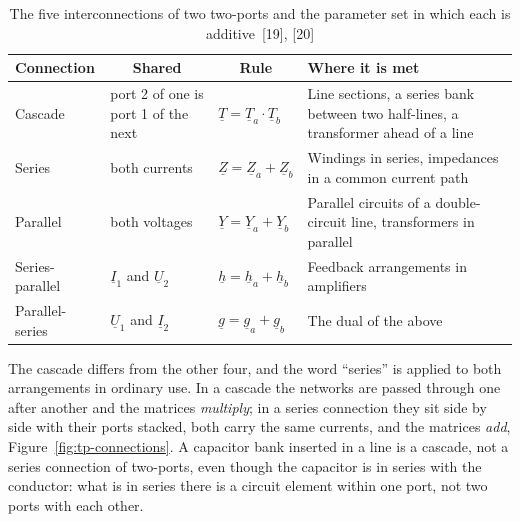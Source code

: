 \begin{table}[!ht]
  \centering
  \begin{tabularx}{\linewidth}{@{}l l l X@{}}
    \toprule
    \textbf{Connection} & \multicolumn{1}{c}{\textbf{Shared}}
      & \multicolumn{1}{c}{\textbf{Rule}} & \textbf{Where it is met} \\
    \midrule
    Cascade & port 2 of one is port 1 of the next
      & $\underline{T} = \underline{T}_a \cdot \underline{T}_b$
      & Line sections, a series bank between two half-lines, a transformer
        ahead of a line \\
    Series & both currents
      & $\underline{Z} = \underline{Z}_a + \underline{Z}_b$
      & Windings in series, impedances in a common current path \\
    Parallel & both voltages
      & $\underline{Y} = \underline{Y}_a + \underline{Y}_b$
      & Parallel circuits of a double-circuit line, transformers in
        parallel \\
    Series-parallel & $\underline{I}_1$ and $\underline{U}_2$
      & $\underline{h} = \underline{h}_a + \underline{h}_b$
      & Feedback arrangements in amplifiers \\
    Parallel-series & $\underline{U}_1$ and $\underline{I}_2$
      & $\underline{g} = \underline{g}_a + \underline{g}_b$
      & The dual of the above \\
    \bottomrule
  \end{tabularx}
  \caption{The five interconnections of two two-ports and the parameter set
           in which each is additive~[19], [20]}
  \label{tab:tp-interconnection}
\end{table}

The cascade differs from the other four, and the word ``series'' is applied
to both arrangements in ordinary use. In a cascade the
networks are passed through one after another and the matrices
\emph{multiply}; in a series connection they sit side by side with their
ports stacked, both carry the same currents, and the matrices \emph{add},
Figure~\ref{fig:tp-connections}.
A capacitor bank inserted in a line is a cascade, not a series connection of
two-ports, even though the capacitor is in series with the conductor: what
is in series there is a circuit element within one port, not two ports with
each other.


